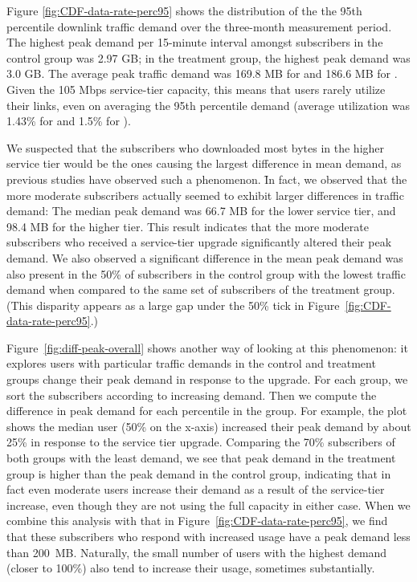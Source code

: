 Figure \ref{fig:CDF-data-rate-perc95} shows the distribution of the the
95th percentile downlink traffic demand over the three-month measurement
period. The highest peak demand per 15-minute interval amongst
subscribers in the control group was 2.97 GB; in the treatment group,
the highest peak demand was 3.0 GB.
The average peak traffic demand was 169.8 MB for \control{} and
186.6 MB for \treatment{}. Given the 105 Mbps service-tier capacity,
this means that users rarely utilize their links,
even on averaging the 95th percentile demand (average utilization was 
1.43\% for \control{} and 1.5\% for \treatment{}).

We suspected that the subscribers who downloaded most bytes in the
higher service tier would be the ones causing the largest difference in
mean demand, as previous studies have observed such a phenomenon. \f{In
  fact, we observed that the more moderate subscribers actually seemed
  to exhibit larger differences in traffic demand: The median peak demand
  was 66.7 MB for the lower service tier, and 98.4 MB for the higher
  tier.  This result indicates that the more moderate subscribers who
  received a service-tier upgrade significantly altered their peak
  demand.}  We also observed a significant difference in the mean peak
demand was also present in the 50\% of subscribers in the control group
with the lowest traffic demand when compared to the same set of
subscribers of the treatment group. (This disparity appears as a large
gap under the 50\% tick in Figure~\ref{fig:CDF-data-rate-perc95}.)


Figure~\ref{fig:diff-peak-overall} shows another way of looking at this
phenomenon: it explores users with particular traffic demands in the
control and treatment groups change their peak demand in response to the
upgrade.  For each group, we sort the subscribers according to
increasing demand.  Then we compute the difference in peak demand for
each percentile in the group.  For example, the plot shows the median
user (50\% on the x-axis) increased their peak demand by about 25\% in
response to the service tier upgrade.  Comparing the 70\% subscribers of
both groups with the least demand, we see that peak demand in the
treatment group is higher than the peak demand in the control group,
indicating that in fact even moderate users increase their demand as a
result of the service-tier increase, even though they are not using the
full capacity in either case.
When we combine this analysis with that in
Figure~\ref{fig:CDF-data-rate-perc95}, we find that these subscribers
who respond with increased usage have a peak demand less than 200~MB.
Naturally, the small number of users with the highest demand (closer to
100\%) also tend to increase their usage, sometimes substantially.


